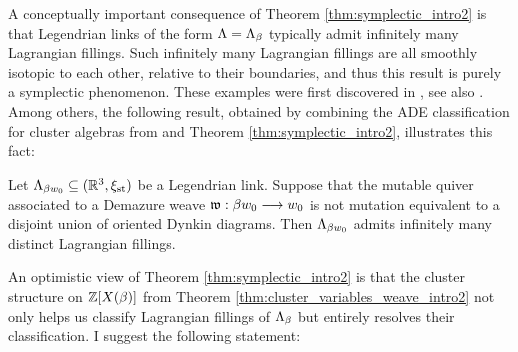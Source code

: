 \noindent A conceptually important consequence of Theorem \ref{thm:symplectic_intro2} is that Legendrian links of the form $\Lambda=\Lambda_\beta$ typically admit infinitely many Lagrangian fillings. Such infinitely many Lagrangian fillings are all smoothly isotopic to each other, relative to their boundaries, and thus this result is purely a symplectic phenomenon. These examples were first discovered in \cite{CasalsGao22}, see also \cite{CasalsGao24,CasalsNg22,GSW2024}. Among others, the following result, obtained by combining the ADE classification for cluster algebras from \cite{FZ2003II} and Theorem \ref{thm:symplectic_intro2}, illustrates this fact:

\begin{corollaryalpha}
Let $\Lambda_{\beta w_0}\subseteq(\mathbb{R}^3,\xi_{\text{st}})$ be a Legendrian link. Suppose that the mutable quiver associated to a Demazure weave $\mathfrak{w}:\beta w_0\longrightarrow w_0$ is not mutation equivalent to a disjoint union of oriented Dynkin diagrams. Then $\Lambda_{\beta w_0}$ admits infinitely many distinct Lagrangian fillings.\sbs
\end{corollaryalpha}

\noindent An optimistic view of Theorem \ref{thm:symplectic_intro2} is that the cluster structure on $\mathbb{Z}[X(\beta)]$ from Theorem \ref{thm:cluster_variables_weave_intro2} not only helps us classify Lagrangian fillings of $\Lambda_\beta$ but entirely resolves their classification. I suggest the following statement:

